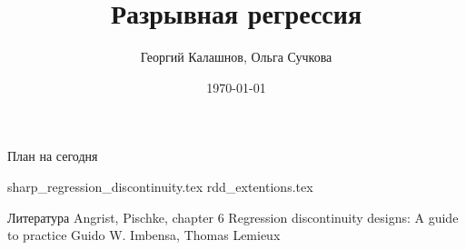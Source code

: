\title{Разрывная регрессия}
\author[Георгий Калашнов, Ольга Сучкова]{Георгий Калашнов, Ольга Сучкова}
\date{\today}



\begin{frame}
  \titlepage
  
\end{frame}



\begin{frame}{План на сегодня} 
\tableofcontents
\end{frame}

{sharp_regression_discontinuity.tex}
{rdd_extentions.tex}


\begin{frame}{Литература}
    Angrist, Pischke, chapter 6
    Regression discontinuity designs: A guide to practice Guido W. Imbensa, Thomas Lemieux
\end{frame}



